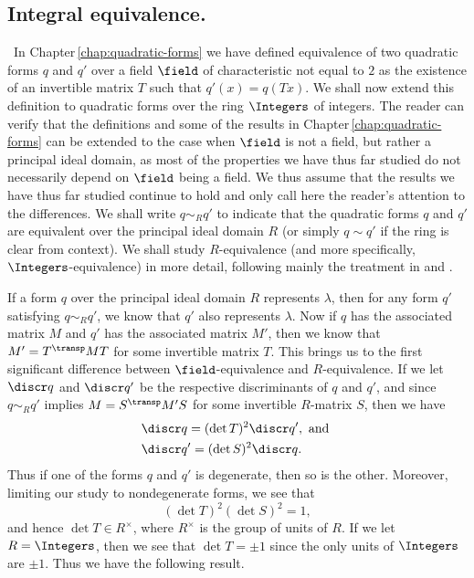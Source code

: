 \subsection{Integral equivalence.}~In Chapter\,\ref{chap:quadratic-forms} we
have defined equivalence of two quadratic forms \(q\) and \(q'\) over a field
\(\field\) of characteristic not equal to \(2\) as the existence of an
invertible matrix \(T\) such that \(q'(x) = q(Tx)\). We shall now extend this
definition to quadratic forms over the ring \(\Integers\) of integers. The
reader can verify that the definitions and some of the results in
Chapter\,\ref{chap:quadratic-forms}  can be extended to the case when \(\field\)
is not a field, but rather a principal ideal domain, as most of the properties
we have thus far studied do not necessarily depend on \(\field\) being a field.
We thus assume that the results we have thus far studied continue to hold and
only call here the reader's attention to the differences. We shall write \(q
\sim_{R} q'\) to indicate that the quadratic forms \(q\) and \(q'\) are
equivalent over the principal ideal domain \(R\) (or simply \(q \sim q'\) if the
ring is clear from context). We shall study \(R\)-equivalence (and more
specifically, \(\Integers\)-equivalence) in more detail, following mainly the
treatment in \cite{cassels2008rational} and \cite{jones1950arithmetic}.

If a form \(q\) over the principal ideal domain \(R\) represents \(\lambda\),
then for any form \(q'\) satisfying \(q \sim_{R} q'\), we know that \(q'\) also
represents \(\lambda\). Now if \(q\) has the associated matrix \(M\) and \(q'\)
has the associated matrix \(M'\), then we know that \(M' = T^{\transp} M T\) for
some invertible matrix \(T\). This brings us to the first significant difference
between \(\field\)-equivalence and \(R\)-equivalence. If we let \(\discr q\) and
\(\discr q'\) be the respective discriminants of \(q\) and \(q'\), and since \(q
\sim_{R} q'\) implies \(M = S^{\transp} M' S\) for some invertible \(R\)-matrix
\(S\), then we have
\begin{align*}
    &\discr q = (\det T)^2 \discr q',\text{ and }\\
    &\discr q' = (\det S)^2 \discr q.
\end{align*}
Thus if one of the forms \(q\) and \(q'\) is degenerate, then so is the other.
Moreover, limiting our study to nondegenerate forms, we see that
\[
  (\det T)^2 (\det S)^2 = 1,
\]
and hence \(\det T \in R^{\times}\), where \(R^{\times}\) is the group of units
of \(R\). If we let \(R = \Integers\), then we see that \(\det T = \pm 1\) since
the only units of \(\Integers\) are \(\pm 1\). Thus we have the following
result.

